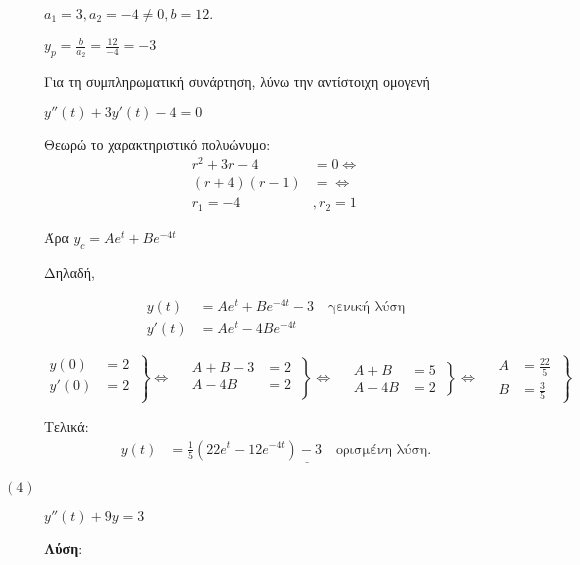\documentclass[a4paper,12pt]{article}
\begin{document}
\begin{description}
$a_1=3, a_2=-4\neq 0, b=12$.

$y_p=\frac{b}{a_2}=\frac{12}{-4}=-3$

Για τη συμπληρωματική συνάρτηση, λύνω την αντίστοιχη ομογενή

$y''(t) +3y'(t) -4 = 0$

Θεωρώ το χαρακτηριστικό πολυώνυμο:
\begin{align*}
r^2+3r-4&=0 \Leftrightarrow \\
(r+4)(r-1) &= \Leftrightarrow \\
r_1=-4&, r_2 = 1
\end{align*}

Άρα $y_c=Ae^{t} +Be^{-4t}$

Δηλαδή,

\begin{align*}
y(t) &=Ae^{t} +Be^{-4t} -3 \quad \text{γενική λύση} \\
y'(t) &= Ae^{t} -4Be^{-4t}
\end{align*}

\[
  \left.\begin{aligned}
y(0)&=2 \\
y'(0)&=2\\
  \end{aligned}\:\right\}\Leftrightarrow \quad
 \left.\begin{aligned}
A+B-3&=2\\
A-4B&=2\\
  \end{aligned}\:\right\}\Leftrightarrow \quad
 \left.\begin{aligned}
A+B&=5\\
A-4B&=2
  \end{aligned}\:\right\}\Leftrightarrow \quad
 \left.\begin{aligned}
A&=\frac{22}{5} \\
B&=\frac{3}{5}
  \end{aligned}\:\right\}
\]


Τελικά: \begin{align*}y(t) &= \underline{\frac{1}{5}(22e^t -12e^{-4t})-3 \quad \text{ορισμένη λύση}}.\end{align*}

\vspace{\baselineskip}


\item [$(4)$] $\boxed{y''(t)+9y=3}$

\textbf{Λύση}:

\vspace{\baselineskip}


\end{description}
\end{document}
